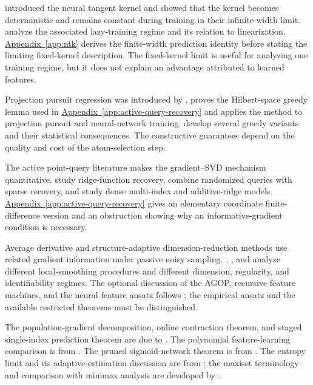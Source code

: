 \documentclass[11pt,twoside]{article}
\newcommand{\appendixref}[1]{\hyperref[#1]{Appendix~\ref*{#1}}}
\theoremstyle{definition}
\theoremstyle{remark}
\begin{document}
\citet{jacot2018} introduced the neural tangent kernel and showed that the
kernel becomes deterministic and remains constant during training in their
infinite-width limit. \citet{chizat2019} analyze the associated lazy-training
regime and its relation to linearization. \appendixref{app:ntk} derives the
finite-width prediction identity before stating the limiting fixed-kernel
description. The fixed-kernel limit is useful for analyzing one training
regime, but it does not explain an advantage attributed to learned features.

Projection pursuit regression was introduced by \citet{friedman1981}.
\citet{jones1992} proves the Hilbert-space greedy lemma used in
\appendixref{app:active-query-recovery} and applies the method to projection
pursuit and neural-network training.
\citet{barroncohendahmendevore2008} develop several greedy variants and their
statistical consequences. The constructive guarantees depend on the
quality and cost of the atom-selection step.

The active point-query literature makes the gradient--SVD mechanism
quantitative. \citet{cohendaubechiesdevore2012} study ridge-function recovery,
\citet{fornasierschnassvybiral2012} combine randomized queries with sparse
recovery, and \citet{tyagicevher2012} study dense multi-index and
additive-ridge models. \appendixref{app:active-query-recovery} gives an
elementary coordinate finite-difference version and an obstruction showing
why an informative-gradient condition is necessary.

Average derivative and structure-adaptive dimension-reduction methods use
related gradient information under passive noisy sampling.
\citet{hristache2001}, \citet{dalalyan2008}, and \citet{xia2002} analyze
different local-smoothing procedures and different dimension, regularity, and
identifiability regimes. The optional discussion of the AGOP, recursive
feature machines, and the neural feature ansatz follows
\citet{radhakrishnan2024}; the empirical ansatz and the available restricted
theorems must be distinguished.

The population-gradient decomposition, online contraction theorem, and
staged single-index prediction theorem are due to \citet{mousavi2023}. The
polynomial feature-learning comparison is from \citet{damian2022}. The
pruned sigmoid-network theorem is from \citet{kohler2026}. The entropy limit
and its adaptive-estimation discussion are from \citet{yang2007}; the
maxiset terminology and comparison with minimax analysis are developed by
\citet{kerkyacharian2002}.
\end{document}
